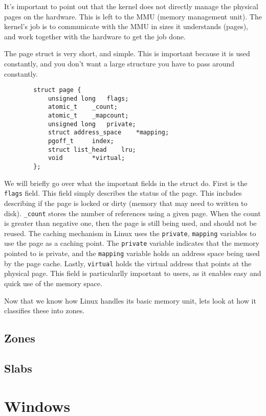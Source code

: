 \documentclass[10pt,letterpaper,onecolumn,draftclsnofoot]{IEEEtran}
\begin{document}
	It's important to point out that the kernel does not directly manage the
	physical pages on the hardware. This is left to the MMU (memory
	management unit). The kernel's job is to communicate with the MMU in
	sizes it understands (pages), and work together with the hardware to
	get the job done. 

	The page struct is very short, and simple. This is important because it
	is used constantly, and you don't want a large structure you have to 
	pass around constantly. \cite{robertlove2010}

	\begin{lstlisting}
		struct page {
			unsigned long	flags;
			atomic_t	_count;
			atomic_t	_mapcount;
			unsigned long	private;
			struct address_space	*mapping;
			pgoff_t		index;
			struct list_head	lru;
			void 		*virtual;
		};
	\end{lstlisting}
	
	We will briefly go over what the important fields in the struct do.
	First is the \texttt{flags} field. This field simply describes the
	status of the page. This includes describing if the page is locked or
	dirty (memory that may need to written to disk). \texttt{\_count}
	stores the number of references using a given page. When the count is
	greater than negative one, then the page is still being used, and should
	not be reused. The caching mechanism in Linux uses the \texttt{private},
	\texttt{mapping} variables to use the page as a caching point. The
	\texttt{private} variable indicates that the memory pointed to is private,
	and the \texttt{mapping} variable holds an address space being used by
	the page cache. Lastly, \texttt{virtual} holds the virtual address that
	points at the physical page. This field is particularlly important to
	users, as it enables easy and quick use of the memory space.

	Now that we know how Linux handles its basic memory unit, lets look at
	how it classifies these into zones. 
  \subsection{Zones}

  \subsection{Slabs}

  \section{Windows}
\end{document}
